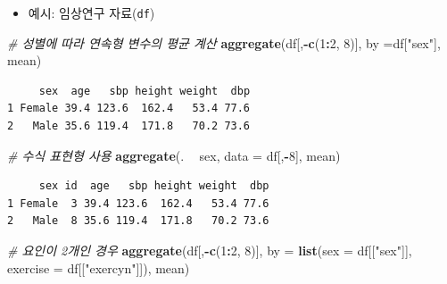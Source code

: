 \documentclass[
  11pt,
]{krantz}
\newenvironment{Shaded}{\begin{snugshade}}{\end{snugshade}}
\newcommand{\CommentTok}[1]{\textcolor[rgb]{0.37,0.37,0.37}{\textit{#1}}}
\newcommand{\DataTypeTok}[1]{\textcolor[rgb]{0.27,0.27,0.27}{#1}}
\newcommand{\DecValTok}[1]{\textcolor[rgb]{0.06,0.06,0.06}{#1}}
\newcommand{\KeywordTok}[1]{\textcolor[rgb]{0.27,0.27,0.27}{\textbf{#1}}}
\newcommand{\NormalTok}[1]{#1}
\newcommand{\OperatorTok}[1]{\textcolor[rgb]{0.43,0.43,0.43}{\textbf{#1}}}
\newcommand{\StringTok}[1]{\textcolor[rgb]{0.5,0.5,0.5}{#1}}
\providecommand{\tightlist}{%
  \setlength{\itemsep}{0pt}\setlength{\parskip}{0pt}}
\begin{document}
\begin{itemize}
\tightlist
\item
  예시: 임상연구 자료(\texttt{df})
\end{itemize}

\footnotesize

\begin{Shaded}
\begin{Highlighting}[]
\CommentTok{# 성별에 따라 연속형 변수의 평균 계산}
\KeywordTok{aggregate}\NormalTok{(df[,}\OperatorTok{-}\KeywordTok{c}\NormalTok{(}\DecValTok{1}\OperatorTok{:}\DecValTok{2}\NormalTok{, }\DecValTok{8}\NormalTok{)], }\DataTypeTok{by =}\NormalTok{df[}\StringTok{"sex"}\NormalTok{], mean)}
\end{Highlighting}
\end{Shaded}

\begin{verbatim}
     sex  age   sbp height weight  dbp
1 Female 39.4 123.6  162.4   53.4 77.6
2   Male 35.6 119.4  171.8   70.2 73.6
\end{verbatim}

\begin{Shaded}
\begin{Highlighting}[]
\CommentTok{# 수식 표현형 사용}
\KeywordTok{aggregate}\NormalTok{(. }\OperatorTok{~}\StringTok{ }\NormalTok{sex, }
          \DataTypeTok{data =}\NormalTok{ df[,}\OperatorTok{-}\DecValTok{8}\NormalTok{], }
\NormalTok{          mean)}
\end{Highlighting}
\end{Shaded}

\begin{verbatim}
     sex id  age   sbp height weight  dbp
1 Female  3 39.4 123.6  162.4   53.4 77.6
2   Male  8 35.6 119.4  171.8   70.2 73.6
\end{verbatim}

\begin{Shaded}
\begin{Highlighting}[]
\CommentTok{# 요인이 2개인 경우}
\KeywordTok{aggregate}\NormalTok{(df[,}\OperatorTok{-}\KeywordTok{c}\NormalTok{(}\DecValTok{1}\OperatorTok{:}\DecValTok{2}\NormalTok{, }\DecValTok{8}\NormalTok{)], }
          \DataTypeTok{by =} \KeywordTok{list}\NormalTok{(}\DataTypeTok{sex =}\NormalTok{ df[[}\StringTok{"sex"}\NormalTok{]], }\DataTypeTok{exercise =}\NormalTok{ df[[}\StringTok{"exercyn"}\NormalTok{]]), }
\NormalTok{          mean)}
\end{Highlighting}
\end{Shaded}
\end{document}
